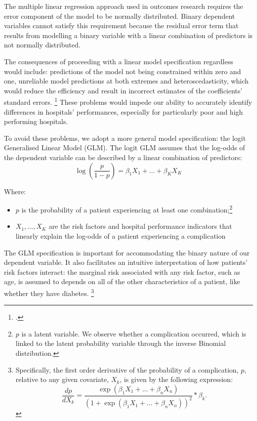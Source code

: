 \documentclass[submission]{grattan}
\begin{document}
The multiple linear regression approach used in outcomes research requires the error component of the model to be normally distributed.
Binary dependent variables cannot satisfy this requirement because the residual error term that results from modelling a binary variable with a linear combination of predictors is not normally distributed.

The consequences of proceeding with a linear model specification regardless would include: predictions of the model not being constrained within zero and one, unreliable model predictions at both extremes and heteroscedasticity, which would reduce the efficiency and result in incorrect estimates of the coefficients' standard errors.%
	\footcite{Mostly-harmless-econometrics-2009}
These problems would impede our ability to accurately identify differences in hospitals' performances, especially for particularly poor and high performing hospitals.

To avoid these problems, we adopt a more general model specification: the logit Generalised Linear Model (GLM).
The logit GLM assumes that the log-odds of the dependent variable can be described by a linear combination of predictors:
\[\log\left( \frac{p}{1 - p} \right) = \beta_{1}X_{1} + \ldots + \beta_{K}X_{K}\]

Where:

\begin{itemize}
\item[]
  \(p\) is the probability of a patient experiencing at least one combination;\footnote{\(p\) is a latent variable.
We observe whether a complication occurred, which is linked to the latent probability variable through the inverse Binomial distribution.}
\item[]
  \(X_{1},\dots,X_{K}\) are the risk factors and hospital performance indicators that linearly explain the log-odds of a patient experiencing a complication
\end{itemize}

The GLM specification is important for accommodating the binary nature of our dependent variable.
It also facilitates an intuitive interpretation of how patients' risk factors interact: the marginal risk associated with any risk factor, such as age, is assumed to depends on all of the other characteristics of a patient, like whether they have diabetes.%
	\footnote{Specifically, the first order derivative of the probability of a complication, \(p\), relative to any given covariate, \(X_{k}\), is given by the following expression:
  \[\frac{dp}{dX_{k}} = \frac{\exp(\beta_{1}X_{1} + \dots + \beta_{n}X_{n})}{\left(1 + \exp\left(\beta_{1}X_{1} + \dots + \beta_{n}X_{n}\right)\right)^{2}}*\beta_{k}.\]}
\end{document}
